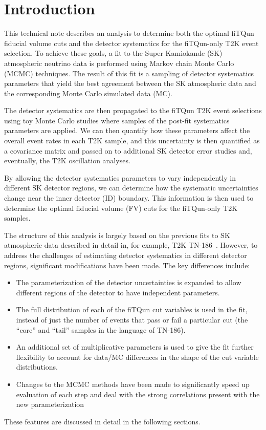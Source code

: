 
\section{Introduction}
\label{subsec:intro}

This technical note describes an analysis to determine both the optimal fiTQun
fiducial volume cuts and the detector systematics for the fiTQun-only T2K event
selection.  To achieve these goals, a fit to the Super Kamiokande (SK)
atmospheric neutrino data is performed using Markov chain Monte Carlo (MCMC)
techniques.  The result of this fit is a sampling of detector systematics
parameters that yield the best agreement between the SK atmospheric data and the
corresponding Monte Carlo simulated data (MC).

The detector systematics are then propagated to the fiTQun T2K event selections
using toy Monte Carlo studies where samples of the post-fit systematics parameters are
applied.  We can then quantify how these parameters affect the overall event
rates in each T2K sample, and this uncertainty is then quantified as a covariance matrix
and passed on to additional SK detector error studies and, eventually, the T2K
oscillation analyses.

By allowing the detector systematics parameters to vary independently in
different SK detector regions, we can determine how the systematic uncertainties
change near the inner detector (ID) boundary.  This information is then used to determine
the optimal fiducial volume (FV) cuts for the fiTQun-only T2K samples.

The structure of this analysis is largely based on the previous fits to SK atmospheric data
described in detail in, for example, T2K TN-186~\cite{tn186}.  However, to address the challenges of
estimating detector systematics in different detector regions, 
significant modifications have been made. The key differences include:
%
\begin{itemize}
  \item The parameterization of the detector uncertainties is expanded to allow
    different regions of the detector to have independent 
    parameters.
  \item The full distribution of each of the fiTQun cut variables is used in
    the fit, instead of just the number of events that pass or fail a particular
    cut (the ``core'' and ``tail'' samples in the language of TN-186).  
  \item An additional set of multiplicative parameters is used to give the fit
    further flexibility to account for data/MC differences in the shape of the
    cut variable distributions.
  \item Changes to the MCMC methods have been made to significantly speed up
    evaluation of each step and deal with the strong correlations present with
    the new parameterization
\end{itemize}
%
These features are discussed in detail in the following sections.



